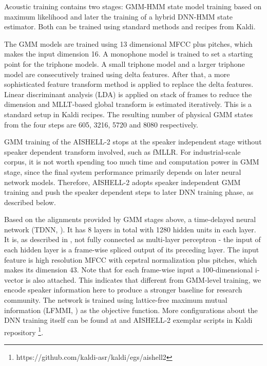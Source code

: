 \documentclass[a4paper]{article}
\begin{document}
Acoustic training contains two stages: GMM-HMM state model training based on maximum likelihood and later the training of a hybrid DNN-HMM state estimator. Both can be trained using standard methods and recipes from Kaldi.

The GMM models are trained using 13 dimensional MFCC plus pitches, which makes the input dimension 16.
A monophone model is trained to set a starting point for the triphone models. A small triphone model and a larger triphone model are consecutively trained using delta features. After that, a more sophisticated feature transform method is applied to replace the delta features. Linear discriminant analysis (LDA) is applied on stack of frames to reduce the dimension and MLLT-based global transform is estimated iteratively. This is a standard setup in Kaldi recipes. The resulting number of physical GMM states from the four steps are 605, 3216, 5720 and 8080 respectively.

GMM training of the AISHELL-2 stops at the speaker independent stage without speaker dependent transform involved, such as fMLLR. For industrial-scale corpus, it is not worth spending too much time and computation power in GMM stage, since the final system performance primarily depends on later neural network models. Therefore, AISHELL-2 adopts speaker independent GMM training and push the speaker dependent steps to later DNN training phase, as described below.

Based on the alignments provided by GMM stages above, a time-delayed neural network (TDNN, \cite{tdnn}). It has 8 layers in total with 1280 hidden units in each layer. It is, as described in \cite{tdnn}, not fully connected as multi-layer perceptron - the input of each hidden layer is a frame-wise spliced output of its preceding layer. The input feature is high resolution MFCC with cepstral normalization plus pitches, which makes its dimension 43. Note that for each frame-wise input a 100-dimensional i-vector is also attached. This indicates that different from GMM-level training, we encode speaker information here to produce a stronger baseline for research community. The network is trained using lattice-free maximum mutual information (LFMMI, \cite{lfmmi}) as the objective function. More configurations about the DNN training itself can be found at \cite{lfmmi} and AISHELL-2 exemplar scripts in Kaldi repository \footnote{https://github.com/kaldi-asr/kaldi/egs/aishell2}.

\end{document}
